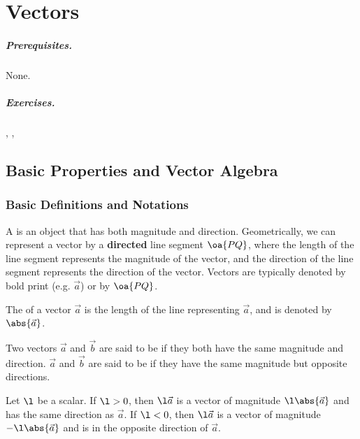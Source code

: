 \chapter{Vectors}

\paragraph{Prerequisites.} None.
\paragraph{Exercises.} , , 

\section{Basic Properties and Vector Algebra}

\subsection{Basic Definitions and Notations}

\begin{definition}
    A  is an object that has both magnitude and direction. Geometrically, we can represent a vector by a \textbf{directed} line segment $\oa{PQ}$, where the length of the line segment represents the magnitude of the vector, and the direction of the line segment represents the direction of the vector. Vectors are typically denoted by bold print (e.g. $\vec a$) or by $\oa{PQ}$.
\end{definition}

\begin{definition}
    The  of a vector $\vec a$ is the length of the line representing $\vec a$, and is denoted by $\abs{\vec a}$.
\end{definition}

\begin{definition}
    Two vectors $\vec a$ and $\vec b$ are said to be  if they both have the same magnitude and direction. $\vec a$ and $\vec b$ are said to be  if they have the same magnitude but opposite directions.
\end{definition}

\begin{definition}
    Let $\l$ be a scalar. If $\l > 0$, then $\l \vec a$ is a vector of magnitude $\l \abs{\vec a}$ and has the same direction as $\vec a$. If $\l < 0$, then $\l \vec a$ is a vector of magnitude $-\l \abs{\vec a}$ and is in the opposite direction of $\vec a$.
\end{definition}

